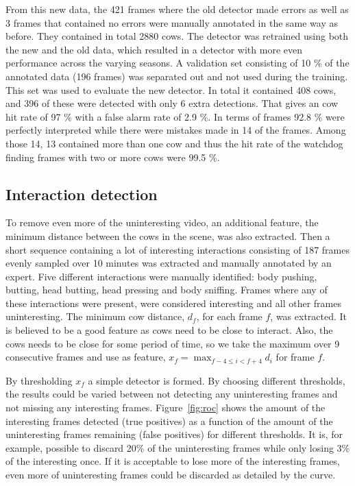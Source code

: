 \documentclass{cta-author}
\begin{document}
From this new data, the 421 frames where the old detector made errors as well as 3 frames that contained no errors were manually annotated in the same way as before. They contained in total 2880 cows. The detector was retrained using both the new and the old data, which resulted in a detector with more even performance across the varying seasons. A validation set consisting of 10 \% of the annotated data (196 frames) was separated out and not used during the training. This set was used to evaluate the new detector. In total it contained 408 cows, and 396 of these were detected with only 6 extra detections. That gives an cow hit rate of 97 \% with a false alarm rate of 2.9 \%. In terms of frames 92.8 \% were perfectly interpreted while there were mistakes made in 14 of the frames. Among those 14, 13 contained more than one cow and thus the hit rate of the watchdog finding frames with two or more cows were 99.5 \%.

\subsection{Interaction detection}
To remove even more of the uninteresting video, an additional feature, the minimum distance between the cows in the scene, was also extracted. Then a short sequence containing a lot of interesting interactions consisting of 187 frames evenly sampled over 10 minutes was extracted and manually annotated by an expert. Five different interactions were manually identified: body pushing, butting, head butting, head pressing and body sniffing. Frames where any of these interactions were present, were considered interesting and all other frames uninteresting. The minimum cow distance, $d_f$, for each frame $f$, was extracted. It is believed to be a good feature as cows need to be close to interact. Also, the cows needs to be close for some period of time, so we take the maximum over 9 consecutive frames and use as feature, 
$x_f = \max_{f-4 \leq i < f+4} d_i$ for frame $f$.

By thresholding $x_f$ a simple detector is formed. By choosing different thresholds, the results could be varied between not detecting any uninteresting frames and not missing any interesting frames. Figure~\ref{fig:roc} shows the amount of the interesting frames detected (true positives) as a function of the amount of the uninteresting frames remaining (false positives) for different thresholds. It is, for example, possible to discard 20\% of the uninteresting frames while only losing 3\% of the interesting once. If it is acceptable to lose more of the interesting frames, even more of uninteresting frames could be discarded as detailed by the curve.
\end{document}
